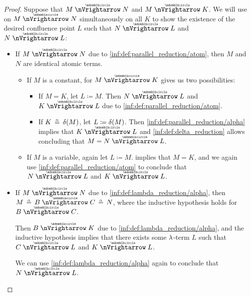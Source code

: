 \begin{proof}
   Suppose that \( M \ppred N \) and \( M \ppred K \). We will use  on \( M \ppred N \) simultaneously on all \( K \) to show the existence of the desired confluence point \( L \) such that \( N \ppred L \) and \( N \ppred L \):
  \begin{itemize}
    \item If \( M \ppred N \) due to \ref{inf:def:parallel_reduction/atom}, then \( M \) and \( N \) are identical atomic terms.

    \begin{itemize}
      \item If \( M \) is a constant,  for \( M \ppred K \) gives us two possibilities:
      \begin{itemize}
        \item If \( M = K \), let \( L \coloneqq M \). Then \( N \ppred L \) and \( K \ppred L \) due to \ref{inf:def:parallel_reduction/atom}.

        \item If \( K \aequiv \op*{\delta}(M) \), let \( L \coloneqq \op*{\delta}(M) \). Then \ref{inf:def:parallel_reduction/alpha} implies that \( K \ppred L \) and \ref{inf:def:delta_reduction} allows concluding that \( M = N \ppred L \).
      \end{itemize}

      \item If \( M \) is a variable, again let \( L \coloneqq M \).  implies that \( M = K \), and we again use \ref{inf:def:parallel_reduction/atom} to conclude that \( N \ppred L \) and \( K \ppred L \).
    \end{itemize}

    \item If \( M \ppred N \) due to \ref{inf:def:lambda_reduction/alpha}, then \( M \aequiv B \ppred C \aequiv N \), where the inductive hypothesis holds for \( B \ppred C \).

    Then \( B \ppred K \) due to \ref{inf:def:lambda_reduction/alpha}, and the inductive hypothesis implies that there exists some \( \mathrm{\lambda} \)-term \( L \) such that \( C \ppred L \) and \( K \ppred L \).

    We can use \ref{inf:def:lambda_reduction/alpha} again to conclude that \( N \ppred L \).


\end{itemize}
\end{proof}
